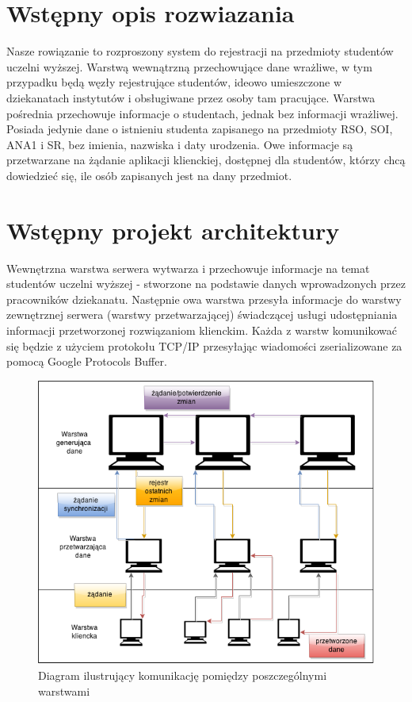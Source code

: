 \section[Wstępny opis rozwiązania]{Wstępny opis rozwiazania}

\par{Nasze rowiązanie to rozproszony system do rejestracji na przedmioty studentów uczelni wyższej. Warstwą wewnątrzną przechowujące dane wrażliwe, w tym przypadku będą węzły rejestrujące studentów, ideowo umieszczone w dziekanatach instytutów i obsługiwane przez osoby tam pracujące. Warstwa pośrednia przechowuje informacje o studentach, jednak bez informacji wrażliwej. Posiada jedynie dane o istnieniu studenta zapisanego na przedmioty RSO, SOI, ANA1 i SR,  bez imienia, nazwiska i daty urodzenia. Owe informacje są przetwarzane na żądanie aplikacji klienckiej, dostępnej dla studentów, którzy chcą dowiedzieć się, ile osób zapisanych jest na dany przedmiot.}

\section[Wstępny projekt architektury]{Wstępny projekt architektury}

\par{Wewnętrzna warstwa serwera wytwarza i przechowuje informacje na temat studentów uczelni wyższej - stworzone na podstawie danych wprowadzonych przez pracowników dziekanatu. Następnie owa warstwa przesyła informacje do warstwy zewnętrznej serwera (warstwy przetwarzającej) świadczącej usługi udostępniania informacji przetworzonej rozwiązaniom klienckim. Każda z warstw komunikować się będzie z użyciem protokołu TCP/IP przesyłając wiadomości zserializowane za pomocą Google Protocols Buffer.}

\begin{figure}[h]
\begin{center}
\includegraphics[width=0.9\linewidth]{img/dane_net.png} 
\caption{Diagram ilustrujący komunikację pomiędzy poszczególnymi warstwami}
\label{img:dane_net}
\end{center}
\end{figure}

